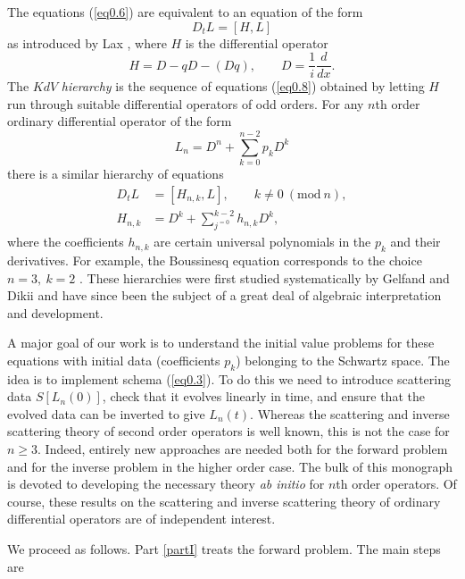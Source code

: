 \documentclass{surv-l}
\theoremstyle{plain}
\theoremstyle{definition}
\numberwithin{equation}{chapter}
\begin{document}
The equations (\ref{eq0.6}) are equivalent to an equation of the form
\begin{equation}\label{eq0.8}
D_{t}L=[H, L]
\end{equation}
as introduced by Lax \cite{Lx}, where $H$ is the differential operator
\begin{equation*}
H=D-qD-(Dq),\qquad D=\frac{1}{i}\frac{d}{dx}.
\end{equation*}
The $KdV$ \emph{hierarchy} is the sequence of equations (\ref{eq0.8}) obtained by letting $H$ run through suitable differential operators of odd orders. For any $n$th order ordinary differential operator of the form
\begin{equation*}
L_{n}=D^{n}+\sum_{k=0}^{n-2}p_{k}D^{k}
\end{equation*}
there is a similar hierarchy of equations
\begin{align}
D_{t}L &=  [H_{n,k},L],\qquad k\neq 0\ (\mathrm{mod}\ n),\label{eq0.9}\\
H_{n,k} &=  D^{k}+\sum_{j^{=0}}^{k-2}h_{n,k}D^{k},\nonumber
\end{align}
where the coefficients $h_{n, k}$ are certain universal polynomials in the $p_{k}$ and their derivatives. For example, the Boussinesq equation corresponds to the choice $n = 3,\ k=2$ \cite{Za, McK, DTT}. These hierarchies were first studied systematically by Gelfand and Dikii \cite{GD} and have since been the subject of a great deal of algebraic interpretation and development.

A major goal of our work is to understand the initial value problems for these equations with initial data (coefficients $p_{k}$) belonging to the Schwartz space. The idea is to implement schema (\ref{eq0.3}). To do this we need to introduce scattering data $S[L_{n}(0)]$, check that it evolves linearly in time, and ensure that the evolved data can be inverted to give $L_{n}(t)$. Whereas the scattering and inverse scattering theory of second order operators is well known, this is not the case for $n\geq 3$. Indeed, entirely new approaches are needed both for the forward problem and for the inverse problem in the higher order case. The bulk of this monograph is devoted to developing the necessary theory \emph{ab initio} for $n$th order operators. Of course, these results on the scattering and inverse scattering theory of ordinary differential operators are of independent interest.

We proceed as follows. Part \ref{partI} treats the forward problem. The main steps are
\end{document}
